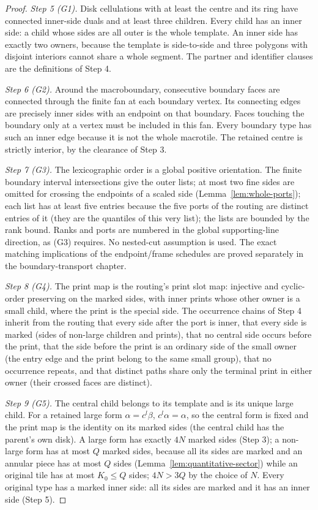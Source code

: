 \documentclass[11pt,a4paper]{article}
\theoremstyle{remark}
\begin{document}
\begin{proof}
\emph{Step 5 (G1).}  Disk cellulations with at least the centre and its ring
have connected inner-side duals and at least three children.  Every child has
an inner side: a child whose sides are all outer is the whole template.  An
inner side has exactly two owners, because the template is side-to-side and
three polygons with disjoint interiors cannot share a whole segment.  The
partner and identifier clauses are the definitions of Step 4.

\emph{Step 6 (G2).}  Around the macroboundary, consecutive boundary faces are
connected through the finite fan at each boundary vertex.  Its connecting
edges are precisely inner sides with an endpoint on that boundary.  Faces
touching the boundary only at a vertex must be included in this fan.  Every
boundary type has such an inner edge because it is not the whole macrotile.
The retained centre is strictly interior, by the clearance of Step 3.

\emph{Step 7 (G3).}  The lexicographic order is a global positive
orientation.  The finite boundary interval intersections give the outer
lists; at most two fine sides are omitted for crossing the endpoints of a
scaled side (Lemma~\ref{lem:whole-ports}); each list has at least five
entries because the five ports of the routing are distinct entries of it
(they are the quantiles of this very list); the lists are bounded by the rank
bound.  Ranks and ports are numbered in the global supporting-line direction,
as (G3) requires.  No nested-cut assumption is used.  The exact matching
implications of the endpoint/frame schedules are proved separately in the
boundary-transport chapter.

\emph{Step 8 (G4).}  The print map is the routing's print slot map: injective
and cyclic-order preserving on the marked sides, with inner prints whose other
owner is a small child, where the print is the special side.  The occurrence
chains of Step 4 inherit from the routing that every side after the port is
inner, that every side is marked (sides of non-large children and prints),
that no central side occurs before the print, that the side before the print
is an ordinary side of the small owner (the entry edge and the print belong
to the same small group), that no occurrence repeats, and that distinct paths
share only the terminal print in either owner (their crossed faces are
distinct).

\emph{Step 9 (G5).}  The central child belongs to its template and is its
unique large child.  For a retained large form $\alpha=c^l\beta$,
$c^l\alpha=\alpha$, so the central form is fixed and the print map is the
identity on its marked sides (the central child has the parent's own disk).
A large form has exactly $4N$ marked sides (Step 3); a non-large form has at
most $Q$ marked sides, because all its sides are marked and an annular piece
has at most $Q$ sides (Lemma~\ref{lem:quantitative-sector}) while an original
tile has at most $K_0\le Q$ sides; $4N>3Q$ by the choice of $N$.  Every
original type has a marked inner side: all its sides are marked and it has an
inner side (Step 5).


\end{proof}
\end{document}
